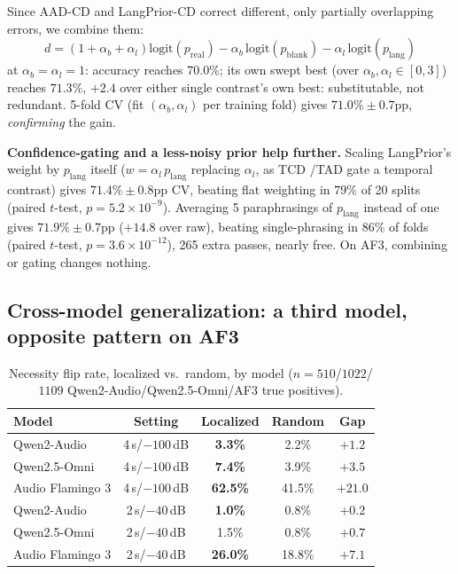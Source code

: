 \documentclass{article}
\newcommand{\qwencombinedacc}{70.0\%}
\newcommand{\qwencombinedcv}{71.0\%}
\newcommand{\qwencombinedcvstd}{0.7}
\newcommand{\gatedacc}{71.4\%}
\newcommand{\gatedstd}{0.8}
\newcommand{\gatedwinfrac}{79\%}
\newcommand{\gatedpval}{5.2\times10^{-9}}
\newcommand{\ensemblegatedacc}{71.9\%}
\newcommand{\ensemblegatedstd}{0.7}
\newcommand{\ensemblewinfrac}{86\%}
\newcommand{\ensemblepval}{3.6\times10^{-12}}
\newcommand{\ensembletotal}{+14.8}
\begin{document}
Since AAD-CD and LangPrior-CD correct different, only partially
overlapping errors, we combine them:
\begin{equation}
d=(1{+}\alpha_b{+}\alpha_l)\mathrm{logit}(p_{\text{real}})
-\alpha_b\,\mathrm{logit}(p_{\text{blank}})-\alpha_l\,\mathrm{logit}(p_{\text{lang}})
\end{equation}
at $\alpha_b{=}\alpha_l{=}1$: accuracy reaches $\qwencombinedacc$; its
own swept best (over $\alpha_b,\alpha_l\in[0,3]$) reaches $71.3\%$,
$+2.4$ over either single contrast's own best: substitutable, not
redundant. 5-fold CV (fit $(\alpha_b,\alpha_l)$ per
training fold) gives $\qwencombinedcv\pm\qwencombinedcvstd$pp,
\emph{confirming} the gain.

\textbf{Confidence-gating and a less-noisy prior help further.} Scaling
LangPrior's weight by $p_{\text{lang}}$ itself ($w=\alpha_l\,
p_{\text{lang}}$ replacing $\alpha_l$, as TCD \cite{li2026tcd}/TAD
\cite{chang2026tad} gate a temporal contrast) gives
$\gatedacc\pm\gatedstd$pp CV, beating flat weighting in
$\gatedwinfrac$ of 20 splits (paired $t$-test, $p{=}\gatedpval$).
Averaging 5 paraphrasings of $p_{\text{lang}}$ instead of one gives
$\ensemblegatedacc\pm\ensemblegatedstd$pp ($\ensembletotal$ over raw),
beating single-phrasing in $\ensemblewinfrac$ of folds (paired
$t$-test, $p{=}\ensemblepval$), 265 extra passes, nearly free. On AF3,
combining or gating changes nothing.

\subsection{Cross-model generalization: a third model, opposite pattern on AF3}

\begin{table}[t]
\centering
\footnotesize
\caption{Necessity flip rate, localized vs.\ random, by model ($n{=}510$/$1022$/$1109$ Qwen2-Audio/Qwen2.5-Omni/AF3 true positives).}
\label{tab:crossmodel}
{\setlength{\tabcolsep}{1.5pt}
\begin{tabular}{@{}lcccc@{}}
\toprule
Model & Setting & Localized & Random & Gap \\
\midrule
Qwen2-Audio & 4\,s/$-100$\,dB & \textbf{3.3\%} & 2.2\% & $+1.2$ \\
Qwen2.5-Omni & 4\,s/$-100$\,dB & \textbf{7.4\%} & 3.9\% & $+3.5$ \\
Audio Flamingo 3 & 4\,s/$-100$\,dB & \textbf{62.5\%} & 41.5\% & $\mathbf{+21.0}$ \\
Qwen2-Audio & 2\,s/$-40$\,dB & \textbf{1.0\%} & 0.8\% & $+0.2$ \\
Qwen2.5-Omni & 2\,s/$-40$\,dB & 1.5\% & 0.8\% & $+0.7$ \\
Audio Flamingo 3 & 2\,s/$-40$\,dB & \textbf{26.0\%} & 18.8\% & $\mathbf{+7.1}$ \\
\bottomrule
\end{tabular}}
\end{table}
\end{document}
